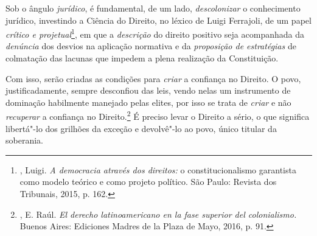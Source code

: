 Sob o ângulo \emph{jurídico}, é fundamental, de um lado,
\emph{descolonizar} o conhecimento jurídico, investindo a Ciência do
Direito, no léxico de Luigi Ferrajoli, de um papel \emph{crítico e
projetual}\footnote{, Luigi. \emph{A democracia através dos
  direitos:} o constitucionalismo garantista como modelo teórico e como
  projeto político. São Paulo: Revista dos Tribunais, 2015, p. 162.}, em
que a \emph{descrição} do direito positivo seja acompanhada da
\emph{denúncia} dos desvios na aplicação normativa e da \emph{proposição
de estratégias} de colmatação das lacunas que impedem a plena realização
da Constituição.

Com isso, serão criadas as condições para \emph{criar} a confiança no
Direito. O povo, justificadamente, sempre desconfiou das leis, vendo
nelas um instrumento de dominação habilmente manejado pelas elites, por
isso se trata de \emph{criar} e não \emph{recuperar} a confiança no
Direito.\footnote{, E. Raúl. \emph{El derecho latinoamericano
  en la fase superior del colonialismo.} Buenos Aires: Ediciones Madres
  de la Plaza de Mayo, 2016, p. 91.} É preciso levar o Direito a sério,
o que significa libertá"-lo dos grilhões da exceção e devolvê"-lo ao povo,
único titular da soberania.
